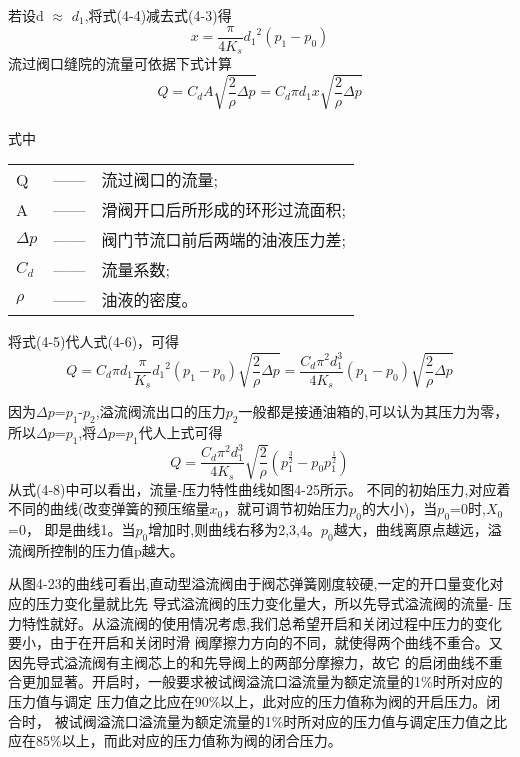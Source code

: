 \par  若设d $\approx$ $d_1$,将式(4-4)减去式(4-3)得
\begin{equation}
   x=\frac{\pi}{4K_s}{d_1}^2(p_1-p_0)\tag{4-5}
\end{equation}
\qquad 流过阀口缝院的流量可依据下式计算 %
\begin{equation}
      Q=C_dA\sqrt{\frac{2}{\rho}\Delta p}=C_d\pi d_1x\sqrt{\frac{2}{\rho}\Delta p}\tag{4-6}
\end{equation}
\\式中\ 
\begin{tabular}[t]{lp{8mm}l}
   Q &—— &流过阀口的流量;\\
   A &—— & 滑阀开口后所形成的环形过流面积;\\
   $\Delta p$ &——&阀门节流口前后两端的油液压力差;\\
   $C_d$ &——&流量系数;\\
   $\rho $ &——&油液的密度。\\
\end{tabular}
\par 将式(4-5)代人式(4-6)，可得
\begin{equation}
   Q=C_d\pi d_1\frac{\pi}{K_s}{d_1}^2(p_1-p_0)\sqrt{\frac{2}{\rho}\Delta p}
=\frac{C_d\pi^2d_1^3}{4K_s}(p_1-p_0)\sqrt{\frac{2}{\rho}\Delta p}\tag{4-7}  
\end{equation}
\par 因为$\Delta p$=$p_1$-$p_2$,溢流阀流出口的压力$p_2$一般都是接通油箱的,可以认为其压力为零，
所以$\Delta p$=$p_1$,将$\Delta p$=$p_1$代人上式可得
\begin{equation}
   Q=\frac{C_d\pi^2d_1^3}{4K_s}\sqrt{\frac{2}{\rho}}(p_1^{\frac{3}{2}}-p_0p_1^\frac{1}{2})\tag{4-8}
\end{equation}
\qquad  从式(4-8)中可以看出，流量-压力特性曲线如图4-25所示。
不同的初始压力,对应着不同的曲线(改变弹簧的预压缩量$x_0$，就可调节初始压力$p_0$的大小)，当$p_0$=0时,$X_0$=0，
即是曲线1。当$p_0$增加时,则曲线右移为2,3,4。$p_0$越大，曲线离原点越远，溢流阀所控制的压力值p越大。

从图4-23的曲线可看出,直动型溢流阀由于阀芯弹簧刚度较硬,一定的开口量变化对应的压力变化量就比先
导式溢流阀的压力变化量大，所以先导式溢流阀的流量-
压力特性就好。从溢流阀的使用情况考虑,我们总希望开启和关闭过程中压力的变化要小，由于在开启和关闭时滑
阀摩擦力方向的不同，就使得两个曲线不重合。又因先导式溢流阀有主阀芯上的和先导阀上的两部分摩擦力，故它
的启闭曲线不重合更加显著。开启时，一般要求被试阀溢流口溢流量为额定流量的1\%时所对应的压力值与调定
压力值之比应在90\%以上，此对应的压力值称为阀的开启压力。闭合时，
被试阀溢流口溢流量为额定流量的1\%时所对应的压力值与调定压力值之比应在85\%以上，而此对应的压力值称为阀的闭合压力。


